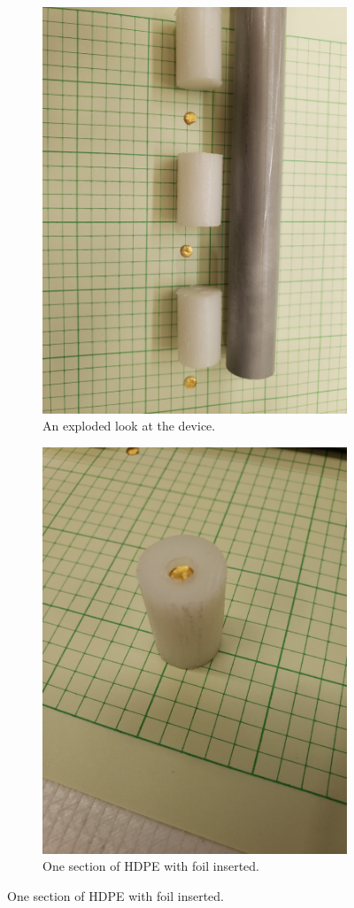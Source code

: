 \documentclass{amsart}
\theoremstyle{definition}
\begin{document}
\begin{figure}[!htb]
\centering
\begin{subfigure}{.5\textwidth}
  \centering
  \includegraphics[width=.8\linewidth]{img/exploded.jpg}
  \caption{An exploded look at the device.}
\end{subfigure}%
\begin{subfigure}{.5\textwidth}
  \centering
  \includegraphics[width=.8\linewidth]{img/section0.jpg}
  \caption{One section of HDPE with foil inserted.}
\end{subfigure}
\end{figure}
\end{document}
